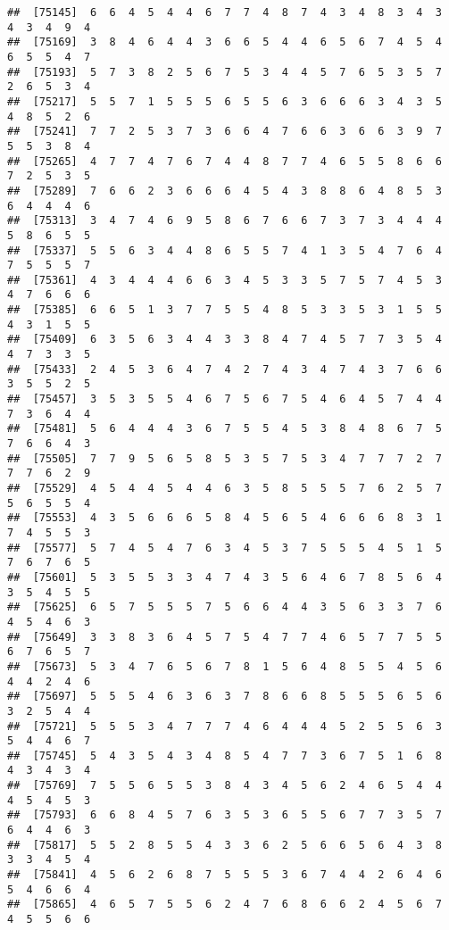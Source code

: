 \documentclass[
]{book}
\begin{document}
\begin{verbatim}
##  [75145]  6  6  4  5  4  4  6  7  7  4  8  7  4  3  4  8  3  4  3  4  3  4  9  4
##  [75169]  3  8  4  6  4  4  3  6  6  5  4  4  6  5  6  7  4  5  4  6  5  5  4  7
##  [75193]  5  7  3  8  2  5  6  7  5  3  4  4  5  7  6  5  3  5  7  2  6  5  3  4
##  [75217]  5  5  7  1  5  5  5  6  5  5  6  3  6  6  6  3  4  3  5  4  8  5  2  6
##  [75241]  7  7  2  5  3  7  3  6  6  4  7  6  6  3  6  6  3  9  7  5  5  3  8  4
##  [75265]  4  7  7  4  7  6  7  4  4  8  7  7  4  6  5  5  8  6  6  7  2  5  3  5
##  [75289]  7  6  6  2  3  6  6  6  4  5  4  3  8  8  6  4  8  5  3  6  4  4  4  6
##  [75313]  3  4  7  4  6  9  5  8  6  7  6  6  7  3  7  3  4  4  4  5  8  6  5  5
##  [75337]  5  5  6  3  4  4  8  6  5  5  7  4  1  3  5  4  7  6  4  7  5  5  5  7
##  [75361]  4  3  4  4  4  6  6  3  4  5  3  3  5  7  5  7  4  5  3  4  7  6  6  6
##  [75385]  6  6  5  1  3  7  7  5  5  4  8  5  3  3  5  3  1  5  5  4  3  1  5  5
##  [75409]  6  3  5  6  3  4  4  3  3  8  4  7  4  5  7  7  3  5  4  4  7  3  3  5
##  [75433]  2  4  5  3  6  4  7  4  2  7  4  3  4  7  4  3  7  6  6  3  5  5  2  5
##  [75457]  3  5  3  5  5  4  6  7  5  6  7  5  4  6  4  5  7  4  4  7  3  6  4  4
##  [75481]  5  6  4  4  4  3  6  7  5  5  4  5  3  8  4  8  6  7  5  7  6  6  4  3
##  [75505]  7  7  9  5  6  5  8  5  3  5  7  5  3  4  7  7  7  2  7  7  7  6  2  9
##  [75529]  4  5  4  4  5  4  4  6  3  5  8  5  5  5  7  6  2  5  7  5  6  5  5  4
##  [75553]  4  3  5  6  6  6  5  8  4  5  6  5  4  6  6  6  8  3  1  7  4  5  5  3
##  [75577]  5  7  4  5  4  7  6  3  4  5  3  7  5  5  5  4  5  1  5  7  6  7  6  5
##  [75601]  5  3  5  5  3  3  4  7  4  3  5  6  4  6  7  8  5  6  4  3  5  4  5  5
##  [75625]  6  5  7  5  5  5  7  5  6  6  4  4  3  5  6  3  3  7  6  4  5  4  6  3
##  [75649]  3  3  8  3  6  4  5  7  5  4  7  7  4  6  5  7  7  5  5  6  7  6  5  7
##  [75673]  5  3  4  7  6  5  6  7  8  1  5  6  4  8  5  5  4  5  6  4  4  2  4  6
##  [75697]  5  5  5  4  6  3  6  3  7  8  6  6  8  5  5  5  6  5  6  3  2  5  4  4
##  [75721]  5  5  5  3  4  7  7  7  4  6  4  4  4  5  2  5  5  6  3  5  4  4  6  7
##  [75745]  5  4  3  5  4  3  4  8  5  4  7  7  3  6  7  5  1  6  8  4  3  4  3  4
##  [75769]  7  5  5  6  5  5  3  8  4  3  4  5  6  2  4  6  5  4  4  4  5  4  5  3
##  [75793]  6  6  8  4  5  7  6  3  5  3  6  5  5  6  7  7  3  5  7  6  4  4  6  3
##  [75817]  5  5  2  8  5  5  4  3  3  6  2  5  6  6  5  6  4  3  8  3  3  4  5  4
##  [75841]  4  5  6  2  6  8  7  5  5  5  3  6  7  4  4  2  6  4  6  5  4  6  6  4
##  [75865]  4  6  5  7  5  5  6  2  4  7  6  8  6  6  2  4  5  6  7  4  5  5  6  6

\end{verbatim}
\end{document}
